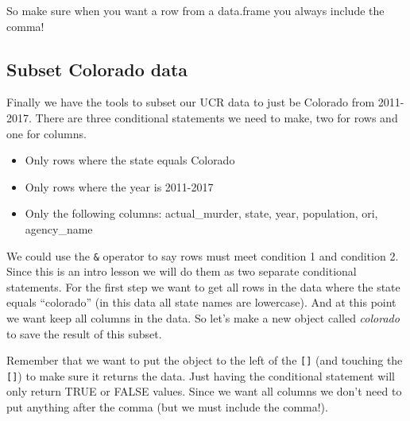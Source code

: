 \documentclass[
  12pt,
]{book}
\newenvironment{Shaded}{\begin{snugshade}}{\end{snugshade}}
\newcommand{\CommentTok}[1]{\textcolor[rgb]{0.56,0.35,0.01}{\textit{#1}}}
\newcommand{\DecValTok}[1]{\textcolor[rgb]{0.00,0.00,0.81}{#1}}
\newcommand{\NormalTok}[1]{#1}
\newcommand{\OperatorTok}[1]{\textcolor[rgb]{0.81,0.36,0.00}{\textbf{#1}}}
\newcommand{\StringTok}[1]{\textcolor[rgb]{0.31,0.60,0.02}{#1}}
\providecommand{\tightlist}{%
  \setlength{\itemsep}{0pt}\setlength{\parskip}{0pt}}
\begin{document}
\begin{Shaded}
\end{Shaded}

So make sure when you want a row from a data.frame you always include the comma!

\hypertarget{subset-colorado-data}{%
\subsection{Subset Colorado data}\label{subset-colorado-data}}

Finally we have the tools to subset our UCR data to just be Colorado from 2011-2017. There are three conditional statements we need to make, two for rows and one for columns.

\begin{itemize}
\tightlist
\item
  Only rows where the state equals Colorado
\item
  Only rows where the year is 2011-2017
\item
  Only the following columns: actual\_murder, state, year, population, ori, agency\_name
\end{itemize}

We could use the \texttt{\&} operator to say rows must meet condition 1 and condition 2. Since this is an intro lesson we will do them as two separate conditional statements. For the first step we want to get all rows in the data where the state equals ``colorado'' (in this data all state names are lowercase). And at this point we want keep all columns in the data. So let's make a new object called \emph{colorado} to save the result of this subset.

Remember that we want to put the object to the left of the \texttt{{[}{]}} (and touching the \texttt{{[}{]}}) to make sure it returns the data. Just having the conditional statement will only return TRUE or FALSE values. Since we want all columns we don't need to put anything after the comma (but we must include the comma!).

\begin{Shaded}
\end{Shaded}
\end{document}
